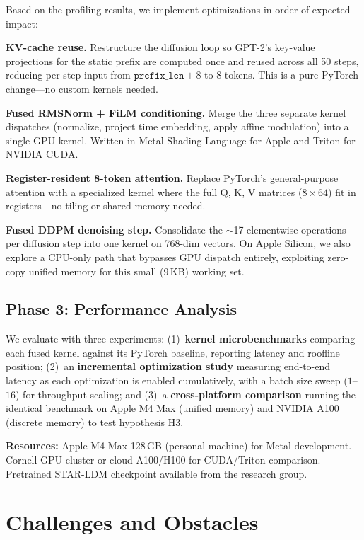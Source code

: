 \documentclass[sigconf,authordraft]{acmart}
\begin{document}
Based on the profiling results, we implement optimizations in order of expected impact:

\textbf{KV-cache reuse.} Restructure the diffusion loop so GPT-2's key-value projections for the static prefix are computed once and reused across all 50 steps, reducing per-step input from $\texttt{prefix\_len}+8$ to 8 tokens. This is a pure PyTorch change---no custom kernels needed.

\textbf{Fused RMSNorm + FiLM conditioning.} Merge the three separate kernel dispatches (normalize, project time embedding, apply affine modulation) into a single GPU kernel. Written in Metal Shading Language for Apple and Triton for NVIDIA CUDA.

\textbf{Register-resident 8-token attention.} Replace PyTorch's general-purpose attention with a specialized kernel where the full Q, K, V matrices ($8 \times 64$) fit in registers---no tiling or shared memory needed.

\textbf{Fused DDPM denoising step.} Consolidate the ${\sim}$17 elementwise operations per diffusion step into one kernel on 768-dim vectors. On Apple Silicon, we also explore a CPU-only path that bypasses GPU dispatch entirely, exploiting zero-copy unified memory for this small (9\,KB) working set.

\subsection{Phase 3: Performance Analysis}

We evaluate with three experiments: (1)~\textbf{kernel microbenchmarks} comparing each fused kernel against its PyTorch baseline, reporting latency and roofline position; (2)~an \textbf{incremental optimization study} measuring end-to-end latency as each optimization is enabled cumulatively, with a batch size sweep ($1$--$16$) for throughput scaling; and (3)~a \textbf{cross-platform comparison} running the identical benchmark on Apple M4 Max (unified memory) and NVIDIA A100 (discrete memory) to test hypothesis H3.

\textbf{Resources:} Apple M4 Max 128\,GB (personal machine) for Metal development. Cornell GPU cluster or cloud A100/H100 for CUDA/Triton comparison. Pretrained STAR-LDM checkpoint available from the research group.

\section{Challenges and Obstacles}
\end{document}
